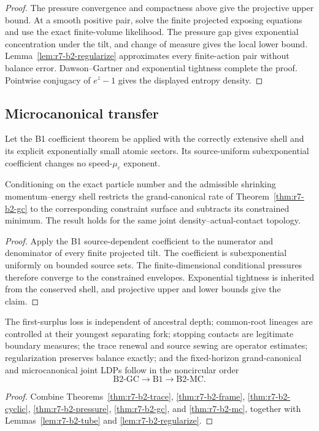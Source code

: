 \begin{proof}
The pressure convergence and compactness above give the projective upper bound.
At a smooth positive pair, solve the finite projected exposing equations and
use the exact finite-volume likelihood.  The pressure gap gives exponential
concentration under the tilt, and change of measure gives the local lower
bound.  Lemma~\ref{lem:r7-b2-regularize} approximates every finite-action pair
without balance error.  Dawson--Gartner and exponential tightness complete the
proof.  Pointwise conjugacy of $e^z-1$ gives the displayed entropy density.
\end{proof}

\subsection{Microcanonical transfer}

Let the B1 coefficient theorem be applied with the correctly extensive shell
and its explicit exponentially small atomic sectors.  Its source-uniform
subexponential coefficient changes no speed-$\mu_\varepsilon$ exponent.

\begin{theorem}
\label{thm:r7-b2-mc}
Conditioning on the exact particle number and the admissible shrinking
momentum--energy shell restricts the grand-canonical rate of
Theorem~\ref{thm:r7-b2-gc} to the corresponding constraint surface and
subtracts its constrained minimum.  The result holds for the same joint
density--actual-contact topology.
\end{theorem}

\begin{proof}
Apply the B1 source-dependent coefficient to the numerator and denominator of
every finite projected tilt.  The coefficient is subexponential uniformly on
bounded source sets.  The finite-dimensional conditional pressures therefore
converge to the constrained envelopes.  Exponential tightness is inherited
from the conserved shell, and projective upper and lower bounds give the claim.
\end{proof}

\begin{theorem}
\label{thm:r7-b2-main}
The first-surplus loss is independent of ancestral depth; common-root
lineages are controlled at their youngest separating fork; stopping contacts
are legitimate boundary measures; the trace renewal and source sewing are
operator estimates; regularization preserves balance exactly; and the
fixed-horizon grand-canonical and microcanonical joint LDPs follow in the
noncircular order
\[
 \mathrm{B2\mbox{-}GC}\longrightarrow\mathrm{B1}
 \longrightarrow\mathrm{B2\mbox{-}MC}.
\]
\end{theorem}

\begin{proof}
Combine Theorems~\ref{thm:r7-b2-trace},
\ref{thm:r7-b2-frame},
\ref{thm:r7-b2-cyclic},
\ref{thm:r7-b2-pressure},
\ref{thm:r7-b2-gc}, and
\ref{thm:r7-b2-mc}, together with
Lemmas~\ref{lem:r7-b2-tube} and
\ref{lem:r7-b2-regularize}.
\end{proof}
